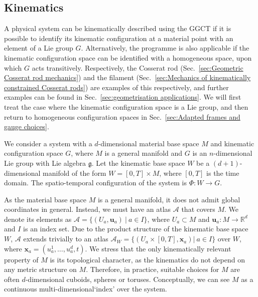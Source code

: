 \subsection{Kinematics} \label{sec:(summary) kinematics}

A physical system can be kinematically described using the GGCT if it is possible to identify its kinematic configuration at a material point with an element of a Lie group $G$. Alternatively, the programme is also applicable if the kinematic configuration space can be identified with a homogeneous space, upon which $G$ acts transitively. Respectively, the Cosserat rod (Sec.~\ref{sec:Geometric Cosserat rod mechanics}) and the filament (Sec.~\ref{sec:Mechanics of kinematically constrained Cosserat rods}) are examples of this respectively, and further examples can be found in Sec.~\ref{sec:geometrisation applications}. We will first treat the case where the kinematic configuration space is a Lie group, and then return to homogeneous configuration spaces in Sec.~\ref{sec:Adapted frames and gauge choices}.

We consider a system with a $d$-dimensional material base space $M$ and kinematic configuration space $G$, where $M$ is a general manifold and $G$ is an $n$-dimensional Lie group with Lie algebra $\mathfrak{g}$. Let the kinematic base space $W$ be a $(d+1)$-dimensional manifold of the form $W = [0, T] \times M$, where $[0, T]$ is the time domain. The spatio-temporal configuration of the system is $\Phi : W \to G$.

As the material base space $M$ is a general manifold, it does not admit global coordinates in general. Instead, we must have an atlas $\mathcal{A}$ that covers $M$. We denote its elements as $\mathcal{A} = \{ (U_a, \mathbf{u}_a)\ |\ a \in I \}$, where $U_a \subset M$ and $\mathbf{u}_a : M \to \mathbb{R}^d$ and $I$ is an index set. Due to the product structure of the kinematic base space $W$, $\mathcal{A}$ extends trivially to an atlas $\mathcal{A}_W = \{ (U_a \times [0, T], \mathbf{x}_a) |\ a \in I \}$ over $W$, where $\mathbf{x}_a = (u_a^1, \dots, u^d_a, t)$. We stress that the only kinematically relevant property of $M$ is its topological character, as the kinematics do not depend on any metric structure on $M$. Therefore, in practice, suitable choices for $M$ are often $d$-dimensional cuboids, spheres or toruses. Conceptually, we can see $M$ as a continuous multi-dimensional`index' over the system.

